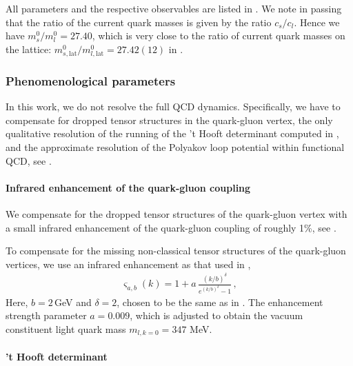 \documentclass[reprint,twocolumn,superscriptaddress,preprintnumbers,amsmath,amssymb,aps,prd,floatfix]{revtex4-2}
\begin{document}
All parameters and the respective observables are listed in . We note in passing that the ratio of the current quark masses is given by the ratio $c_s/c_l$. Hence we have $m_{s}^0/m_{l}^0=27.40$, which is very close to the ratio of current quark masses on the lattice:   $m_{s,\textrm{lat}}^0/m_{l,\textrm{lat}}^0=27.42(12)$ in \cite{FlavourLatticeAveragingGroupFLAG:2024oxs}. 


\subsubsection{Phenomenological parameters} 
\label{app:Pheno}

In this work, we do not resolve the full QCD dynamics. Specifically, we have to compensate for dropped tensor structures in the quark-gluon vertex, the only qualitative resolution of the running of the 't Hooft determinant computed in \cite{Pawlowski:1996ch}, and the approximate resolution of the Polyakov loop potential within functional QCD, see \cite{Haas:2013qwp}. \\[-2ex]


\paragraph{Infrared enhancement of the quark-gluon coupling} 
\label{app:IR-enhancement}

We compensate for the dropped tensor structures of the quark-gluon vertex with a small infrared enhancement of the quark-gluon coupling of roughly 1\%, see . 

To compensate for the missing non-classical tensor structures of the quark-gluon vertices, we use an infrared enhancement as that used in \cite{Braun:2014ata,Fu:2019hdw, Ihssen:2024miv},  
%
\begin{align}
	\varsigma_{a,b}(k) = 1+ a\, \frac{(k/b)^\delta}{e^{(k/b)^\delta}-1}\,, 
	\label{eq:IR-Enhancement}
\end{align}
%
Here, $b=2$\,GeV and $\delta=2$, chosen to be the same as in \cite{Fu:2019hdw}. The enhancement strength parameter $a=0.009$, which is adjusted to obtain the vacuum constituent light quark mass $m_{l,k=0}=347$ MeV.\\[-2ex]


\paragraph{'t Hooft determinant} 
\label{app:thooft}
\end{document}
